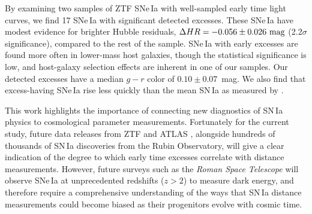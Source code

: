 \documentclass[twocolumn,twocolappendix, linenumbers]{aastex631} %
\begin{document}
By examining two samples of ZTF SNe\,Ia with well-sampled early time light curves, we find 17 SNe\,Ia with significant detected excesses.  These SNe\,Ia have modest evidence for brighter Hubble residuals, $\Delta HR = -0.056 \pm 0.026~{\rm mag}$ (2.2$\sigma$ significance), compared to the rest of the sample.  SNe\,Ia with early excesses are found more often in lower-mass host galaxies, though the statistical significance is low, and host-galaxy selection effects are inherent in one of our samples.  Our detected excesses have a median $g-r$ color of $0.10 \pm 0.07$~mag.  We also find that excess-having SNe\,Ia rise less quickly than the mean \citet{Yao19} SN\,Ia as measured by \citet{Miller20}.

This work highlights the importance of connecting new diagnostics of SN\,Ia physics to cosmological parameter measurements.  Fortunately for the current study, future data releases from ZTF and ATLAS \citep{Tonry18}, alongside hundreds of thousands of SN\,Ia discoveries from the Rubin Observatory, will give a clear indication of the degree to which early time excesses correlate with distance measurements.  However, future surveys such as the {\it Roman Space Telescope} will observe SNe\,Ia at unprecedented redshifts ($z > 2$) to measure dark energy, and therefore require a comprehensive understanding of the ways that SN\,Ia distance measurements could become biased as their progenitors evolve with cosmic time.



\label{conclusions}
\end{document}
